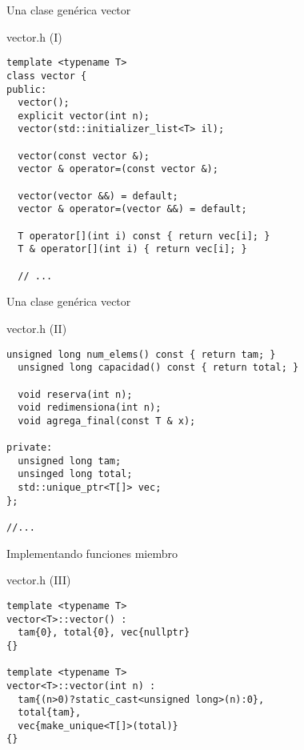 \begin{frame}[t,fragile]{Una clase genérica vector}
\begin{block}{vector.h (I)}
\begin{lstlisting}[]
template <typename T>
class vector {
public:
  vector();
  explicit vector(int n);
  vector(std::initializer_list<T> il);

  vector(const vector &);
  vector & operator=(const vector &);

  vector(vector &&) = default;
  vector & operator=(vector &&) = default;

  T operator[](int i) const { return vec[i]; }
  T & operator[](int i) { return vec[i]; }

  // ...
\end{lstlisting}
\end{block}
\end{frame}

\begin{frame}[t,fragile]{Una clase genérica vector}
\begin{block}{vector.h (II)}
\begin{lstlisting}[]
  unsigned long num_elems() const { return tam; }
  unsigned long capacidad() const { return total; }

  void reserva(int n);
  void redimensiona(int n);
  void agrega_final(const T & x);

private:
  unsigned long tam;
  unsinged long total;
  std::unique_ptr<T[]> vec;
};

//...
\end{lstlisting}
\end{block}
\end{frame}

\begin{frame}[t,fragile]{Implementando funciones miembro}
\begin{block}{vector.h (III)}
\begin{lstlisting}[]
template <typename T>
vector<T>::vector() :
  tam{0}, total{0}, vec{nullptr}
{}

template <typename T>
vector<T>::vector(int n) :
  tam{(n>0)?static_cast<unsigned long>(n):0},
  total{tam},
  vec{make_unique<T[]>(total)}
{}
\end{lstlisting}
\end{block}
\end{frame}


